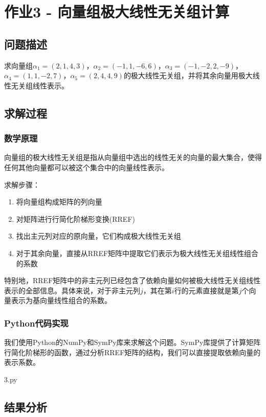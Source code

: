 \documentclass[bwprint]{cumcmthesis}
\begin{document}
\section{作业3 - 向量组极大线性无关组计算}

\subsection{问题描述}
求向量组$\alpha_1=(2,1,4,3)$，$\alpha_2=(-1,1,-6,6)$，$\alpha_3=(-1,-2,2,-9)$，$\alpha_4=(1,1,-2,7)$，$\alpha_5=(2,4,4,9)$的极大线性无关组，并将其余向量用极大线性无关组线性表示。

\subsection{求解过程}

\subsubsection{数学原理}
向量组的极大线性无关组是指从向量组中选出的线性无关的向量的最大集合，使得任何其他向量都可以被这个集合中的向量线性表示。

求解步骤：
\begin{enumerate}
    \item 将向量组构成矩阵的列向量
    \item 对矩阵进行行简化阶梯形变换(RREF)
    \item 找出主元列对应的原向量，它们构成极大线性无关组
    \item 对于其余向量，直接从RREF矩阵中提取它们表示为极大线性无关组线性组合的系数
\end{enumerate}

特别地，RREF矩阵中的非主元列已经包含了依赖向量如何被极大线性无关组线性表示的全部信息。具体来说，对于非主元列$j$，其在第$i$行的元素直接就是第$j$个向量表示为基向量线性组合的系数。

\subsubsection{Python代码实现}
我们使用Python的NumPy和SymPy库来求解这个问题。SymPy库提供了计算矩阵行简化阶梯形的函数，通过分析RREF矩阵的结构，我们可以直接提取依赖向量的表示系数。

\noindent 3.py
    

\subsection{结果分析}
\end{document}
